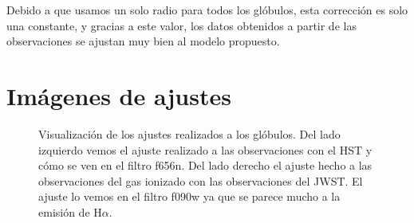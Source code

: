 \documentclass{book}
\begin{document}
Debido a que usamos un solo radio para todos los glóbulos, esta corrección es solo una constante, y gracias a este valor, los datos obtenidos a partir de las observaciones se ajustan muy bien al modelo propuesto.


\chapter{Imágenes de ajustes}

\begin{figure}[htb]
    \centering
    \caption{Visualización de los ajustes realizados a los glóbulos. Del lado izquierdo vemos el ajuste realizado a las observaciones con el HST y cómo se ven en el filtro f656n. Del lado derecho el ajuste hecho a las observaciones del gas ionizado con las observaciones del JWST. El ajuste lo vemos en el filtro f090w ya que se parece mucho a la emisión de H$\alpha$.}
    \label{fig:ajuestes_apendice}
\end{figure}

\newpage


\newpage
\end{document}
